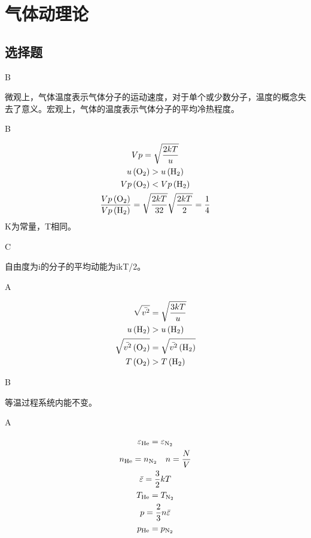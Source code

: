 \chapter{气体动理论}
\section{选择题}
B

\solve 微观上，气体温度表示气体分子的运动速度，对于单个或少数分子，温度的概念失去了意义。宏观上，气体的温度表示气体分子的平均冷热程度。

B

\solve
\begin{gather*} 
{Vp=\sqrt{\frac{2kT}{u}}}\\
{u\left(\ce{O2}\right)}>u\left(\ce{H2}\right)\\
{Vp\left(\ce{O2}\right)<Vp\left(\ce{H2}\right) } \\
\frac{Vp\left(\ce{O2}\right)}{Vp\left(\ce{H2}\right)}=\sqrt{\frac{2kT}{32}} \sqrt{\frac{2kT}{2}}=\frac{1}{4}%
\end{gather*}
K为常量，T相同。

C

\solve 自由度为i的分子的平均动能为ikT/2。

A

\solve

$$
\begin{aligned} \sqrt {\bar{v^{2}}} &=\sqrt{\frac{3kT}{u}} \\
u\left(\ce{H2}\right)& > u\left(\ce{H2}\right) \\
\sqrt {\bar{v^{2}}\left(\ce{O2}\right)}& = \sqrt {\bar{v^{2}}\left(\ce{H2}\right) }\\
T\left(\ce{O2}\right)&>T\left(\ce{H2}\right) 
\end{aligned}
$$

B

\solve 等温过程系统内能不变。

A

\solve

\begin{gather*}
\varepsilon_{\ce{He}}=\varepsilon_{\ce{N2}}\\
n_{\ce{He}}=n_{\ce{N2}}\quad n=\frac{N}{V}\\
\bar{\varepsilon}=\frac{3}{2}kT\\
T_{\ce{He}}=T_{\ce{N2}}\\
p=\frac{2}{3}n\bar{\varepsilon}\\
p_{\ce{He}}=p_{\ce{N2}}
\end{gather*}

